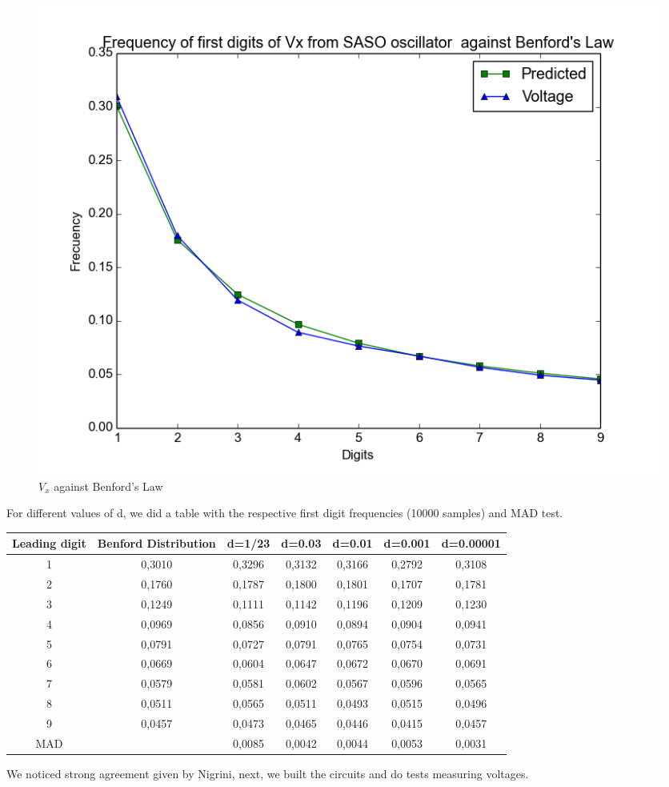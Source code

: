 \begin{itemize}
            \begin{figure}[h]
            \centering
            \includegraphics[scale=0.4]{imagenes/2-benford/Sh_vy.png}
            \caption{$V_x$ against Benford's Law}
            \end{figure}
For different values of d, we did a table with the respective first digit frequencies (10000 samples)  and MAD test.

\begin{center}
  \begin{tabular}{ c | c | c | c | c | c | c }
    \hline
    Leading digit  & Benford Distribution & d=1/23 &d=0.03 &d=0.01& d=0.001 &d=0.00001 \\ \hline
1&		0,3010&	0,3296&	0,3132&	0,3166&	0,2792&	0,3108\\ \hline
2&		0,1760&	0,1787&	0,1800&	0,1801&	0,1707&	0,1781\\ \hline
3&		0,1249&	0,1111&	0,1142&	0,1196&	0,1209&	0,1230\\ \hline
4&		0,0969&	0,0856&	0,0910&	0,0894&	0,0904&	0,0941\\ \hline
5&		0,0791&	0,0727&	0,0791&	0,0765&	0,0754&	0,0731\\ \hline
6&		0,0669&	0,0604&	0,0647&	0,0672&	0,0670&	0,0691\\ \hline
7&		0,0579&	0,0581&	0,0602&	0,0567&	0,0596&	0,0565\\ \hline
8&		0,0511&	0,0565&	0,0511&	0,0493&	0,0515&	0,0496\\ \hline
9&		0,0457&	0,0473&	0,0465&	0,0446&	0,0415&	0,0457\\ \hline
MAD&  & 0,0085&	0,0042&	0,0044&	0,0053&	0,0031\\ \hline

  \end{tabular}
\end{center}
We noticed strong agreement given by Nigrini\cite{Nigrini97}, next, we built the circuits and do tests measuring voltages.

 \end{itemize}
